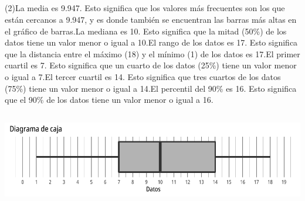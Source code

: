 \documentclass{cdplf-prueba}
\begin{document}
\subsection{}
\begin{tasks}[label={\tcbox[colback=black!60, colframe=black!60, coltext=white, on line, boxsep=0pt, left=3pt, right=3pt, top=2pt, bottom=2pt]{\sffamily\bfseries\alph*}},
item-indent=1.2cm,column-sep=20pt,label-offset=0.3cm,label-width=15pt,after-item-skip=10pt,item-format=\raggedright](2)\task La media es 9.947.
 Esto significa que los valores más frecuentes son los que están cercanos a 9.947, y es donde también se encuentran las barras más altas 
 en el gráfico de barras.\task La mediana es 10. 
 Esto significa que la mitad (50\%) de los datos tiene un valor menor 
 o igual a 10.\task El rango de los datos es 17. Esto 
 significa que la distancia entre el máximo (18) y el mínimo (1) de los datos es 17.\task El primer cuartil es 7. Esto significa que un cuarto de los datos (25\%) tiene un valor 
 menor o igual a 7.\task El tercer cuartil es 14. Esto significa que tres cuartos de los datos (75\%) tiene un valor menor
 o igual a 14.\task El percentil del 90\% es 16. Esto significa que el 90\% de los datos tiene un valor menor o igual a 16.\end{tasks}
\subsection{}
\begin{center}\includegraphics{diagrama_caja_5.pdf}\end{center}
\end{document}
